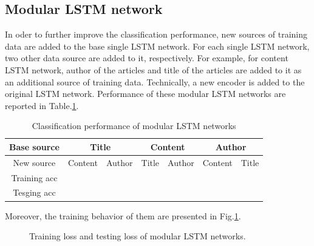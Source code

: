 \documentclass[12pt]{article}
\begin{document}
\subsection{Modular LSTM network}

In oder to further improve the classification performance, new sources of training data are added to the base single LSTM network. For each single LSTM network, two other data source are added to it, respectively. For example, for content LSTM network, author of the articles and title of the articles are added to it as an additional source of training data. Technically, a new encoder is added to the original LSTM network. Performance of these modular LSTM networks are reported in Table.\ref{modular_lstm_acc}.

\begin{table}[!t]
\begin{center}
\caption{Classification performance of modular LSTM networks}
\label{modular_lstm_acc}
\begin{tabular}{c|cc|cc|cc}
\hline

Base source & \multicolumn{2}{c}{Title} & \multicolumn{2}{c}{Content} & \multicolumn{2}{c}{Author} \\
\hline
New source   &   Content   &   Author     &       Title  & Author                &            Content & Title \\
\hline
Training acc   &                   &                  &                &                           &                           & \\
Tesging acc   &                   &                  &                &                           &                           & \\

\hline


\hline
\end{tabular}
\end{center}
\end{table}



Moreover, the training behavior of them are presented in Fig.\ref{training_loss_modular}.


\begin{figure}[!t]
\begin{center}
\end{center}
\caption{Training loss and testing loss of modular LSTM networks.}
\label{training_loss_modular}
\end{figure}
\end{document}
